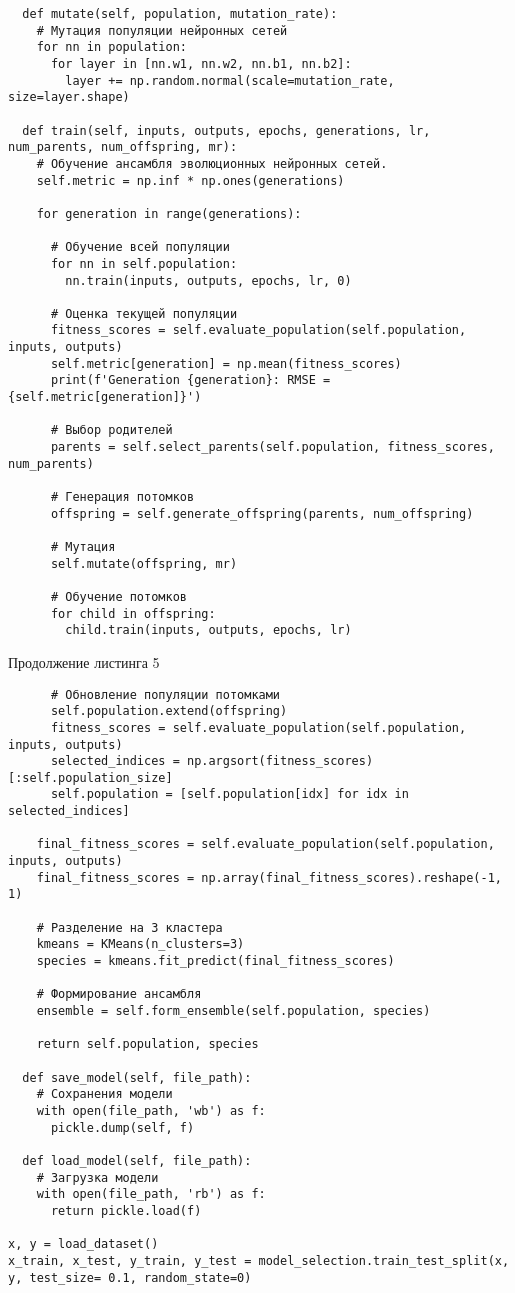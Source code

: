 \documentclass[12pt]{extarticle}
\begin{document}
\begin{lstlisting}
  def mutate(self, population, mutation_rate):
    # Мутация популяции нейронных сетей
    for nn in population:
      for layer in [nn.w1, nn.w2, nn.b1, nn.b2]:
        layer += np.random.normal(scale=mutation_rate, size=layer.shape)

  def train(self, inputs, outputs, epochs, generations, lr, num_parents, num_offspring, mr):
    # Обучение ансамбля эволюционных нейронных сетей.
    self.metric = np.inf * np.ones(generations)

    for generation in range(generations):

      # Обучение всей популяции
      for nn in self.population:
        nn.train(inputs, outputs, epochs, lr, 0)

      # Оценка текущей популяции
      fitness_scores = self.evaluate_population(self.population, inputs, outputs)
      self.metric[generation] = np.mean(fitness_scores)
      print(f'Generation {generation}: RMSE = {self.metric[generation]}')

      # Выбор родителей
      parents = self.select_parents(self.population, fitness_scores, num_parents)

      # Генерация потомков
      offspring = self.generate_offspring(parents, num_offspring)

      # Мутация
      self.mutate(offspring, mr)

      # Обучение потомков
      for child in offspring:
        child.train(inputs, outputs, epochs, lr)
\end{lstlisting}

\newpage

Продолжение листинга 5

\begin{lstlisting}
      # Обновление популяции потомками
      self.population.extend(offspring)
      fitness_scores = self.evaluate_population(self.population, inputs, outputs)
      selected_indices = np.argsort(fitness_scores)[:self.population_size]
      self.population = [self.population[idx] for idx in selected_indices]

    final_fitness_scores = self.evaluate_population(self.population, inputs, outputs)
    final_fitness_scores = np.array(final_fitness_scores).reshape(-1, 1)

    # Разделение на 3 кластера
    kmeans = KMeans(n_clusters=3)
    species = kmeans.fit_predict(final_fitness_scores)

    # Формирование ансамбля
    ensemble = self.form_ensemble(self.population, species)

    return self.population, species

  def save_model(self, file_path):
    # Сохранения модели
    with open(file_path, 'wb') as f:
      pickle.dump(self, f)

  def load_model(self, file_path):
    # Загрузка модели
    with open(file_path, 'rb') as f:
      return pickle.load(f)  

x, y = load_dataset()
x_train, x_test, y_train, y_test = model_selection.train_test_split(x, y, test_size= 0.1, random_state=0)
\end{lstlisting}
\end{document}
